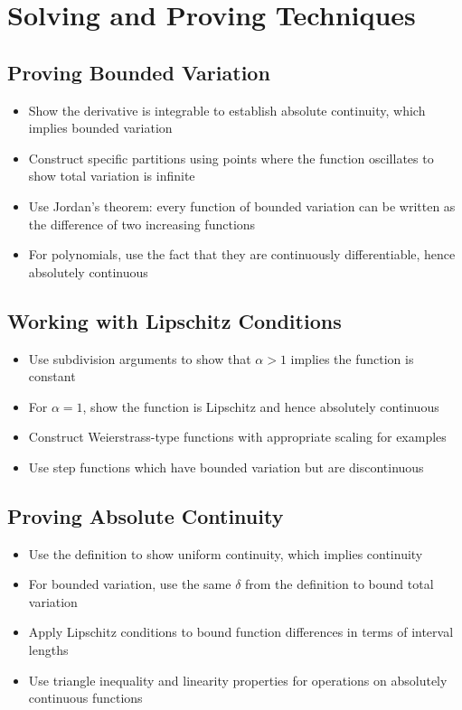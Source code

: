 \section{Solving and Proving Techniques}

\subsection*{Proving Bounded Variation}
\begin{itemize}
\item Show the derivative is integrable to establish absolute continuity, which implies bounded variation
\item Construct specific partitions using points where the function oscillates to show total variation is infinite
\item Use Jordan's theorem: every function of bounded variation can be written as the difference of two increasing functions
\item For polynomials, use the fact that they are continuously differentiable, hence absolutely continuous
\end{itemize}

\subsection*{Working with Lipschitz Conditions}
\begin{itemize}
\item Use subdivision arguments to show that $\alpha > 1$ implies the function is constant
\item For $\alpha = 1$, show the function is Lipschitz and hence absolutely continuous
\item Construct Weierstrass-type functions with appropriate scaling for examples
\item Use step functions which have bounded variation but are discontinuous
\end{itemize}

\subsection*{Proving Absolute Continuity}
\begin{itemize}
\item Use the definition to show uniform continuity, which implies continuity
\item For bounded variation, use the same $\delta$ from the definition to bound total variation
\item Apply Lipschitz conditions to bound function differences in terms of interval lengths
\item Use triangle inequality and linearity properties for operations on absolutely continuous functions
\end{itemize}

